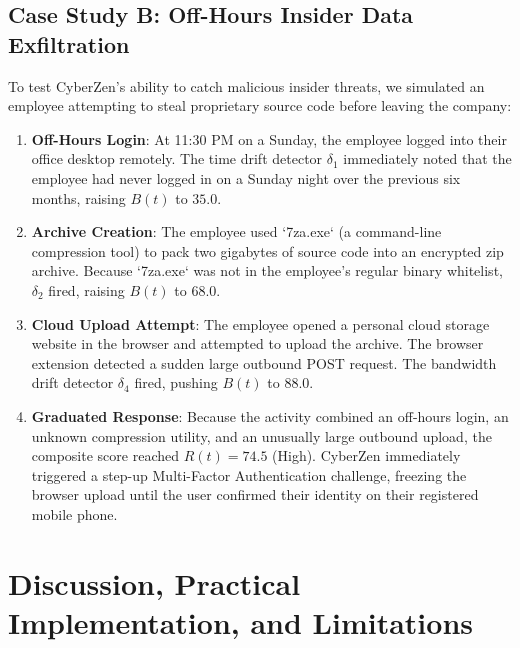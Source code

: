 \documentclass[conference]{IEEEtran}
\begin{document}
\subsection{Case Study B: Off-Hours Insider Data Exfiltration}
To test CyberZen's ability to catch malicious insider threats, we simulated an employee attempting to steal proprietary source code before leaving the company:
\begin{enumerate}
    \item \textbf{Off-Hours Login}: At 11:30 PM on a Sunday, the employee logged into their office desktop remotely. The time drift detector $\delta_1$ immediately noted that the employee had never logged in on a Sunday night over the previous six months, raising $B(t)$ to $35.0$.
    \item \textbf{Archive Creation}: The employee used `7za.exe` (a command-line compression tool) to pack two gigabytes of source code into an encrypted zip archive. Because `7za.exe` was not in the employee's regular binary whitelist, $\delta_2$ fired, raising $B(t)$ to $68.0$.
    \item \textbf{Cloud Upload Attempt}: The employee opened a personal cloud storage website in the browser and attempted to upload the archive. The browser extension detected a sudden large outbound POST request. The bandwidth drift detector $\delta_4$ fired, pushing $B(t)$ to $88.0$.
    \item \textbf{Graduated Response}: Because the activity combined an off-hours login, an unknown compression utility, and an unusually large outbound upload, the composite score reached $R(t) = 74.5$ (High). CyberZen immediately triggered a step-up Multi-Factor Authentication challenge, freezing the browser upload until the user confirmed their identity on their registered mobile phone.
\end{enumerate}

\section{Discussion, Practical Implementation, and Limitations}
\end{document}
